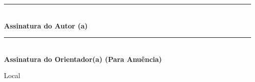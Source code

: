 \documentclass[10pt,a4paper]{article}
\newcommand{\gap}[2]{\vspace{#2mm}}
\newcommand{\FLocal}{}
\begin{document}
\gap{decl-ass}{12.5}

\noindent
\begin{minipage}[t]{6.67cm}
  \centering
  \rule{6.67cm}{0.4pt}\\
  \textbf{\small Assinatura do Autor (a)}
\end{minipage}%
\hfill
\begin{minipage}[t]{7.22cm}
  \centering
  \rule{7.22cm}{0.4pt}\\
  \textbf{\small Assinatura do Orientador(a) (Para Anuência)}
\end{minipage}

\gap{ass-local}{16.0}
{\centering
 \makebox[7.2cm][l]{\rlap{\smash{\makebox[7.2cm][c]{\FLocal}}}\rule[-0.12cm]{7.2cm}{0.4pt}}\par
 \vspace{1.2mm}
 Local\par}
\end{document}
